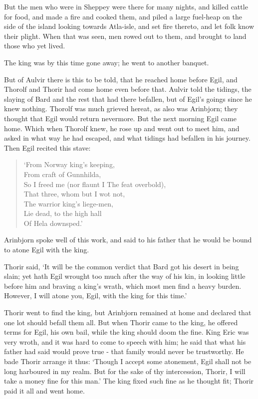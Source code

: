But the men who were in Sheppey were there for many nights, and killed cattle for food, and made a fire and cooked them, and piled a large fuel-heap on the side of the island looking towards Atla-isle, and set fire thereto, and let folk know their plight. When that was seen, men rowed out to them, and brought to land those who yet lived.

The king was by this time gone away; he went to another banquet.

But of Aulvir there is this to be told, that he reached home before Egil, and Thorolf and Thorir had come home even before that. Aulvir told the tidings, the slaying of Bard and the rest that had there befallen, but of Egil's goings since he knew nothing. Thorolf was much grieved hereat, as also was Arinbjorn; they thought that Egil would return nevermore. But the next morning Egil came home. Which when Thorolf knew, he rose up and went out to meet him, and asked in what way he had escaped, and what tidings had befallen in his journey. Then Egil recited this stave:

\begin{verse}
`From Norway king's keeping, \\
From craft of Gunnhilda, \\
So I freed me (nor flaunt I The feat overbold), \\
That three, whom but I wot not, \\
The warrior king's liege-men, \\
Lie dead, to the high hall \\
Of Hela downsped.' \\
\end{verse}

Arinbjorn spoke well of this work, and said to his father that he would be bound to atone Egil with the king.

Thorir said, `It will be the common verdict that Bard got his desert in being slain; yet hath Egil wrought too much after the way of his kin, in looking little before him and braving a king's wrath, which most men find a heavy burden. However, I will atone you, Egil, with the king for this time.'

Thorir went to find the king, but Arinbjorn remained at home and declared that one lot should befall them all. But when Thorir came to the king, he offered terms for Egil, his own bail, while the king should doom the fine. King Eric was very wroth, and it was hard to come to speech with him; he said that what his father had said would prove true - that family would never be trustworthy. He bade Thorir arrange it thus: `Though I accept some atonement, Egil shall not be long harboured in my realm. But for the sake of thy intercession, Thorir, I will take a money fine for this man.' The king fixed such fine as he thought fit; Thorir paid it all and went home.
